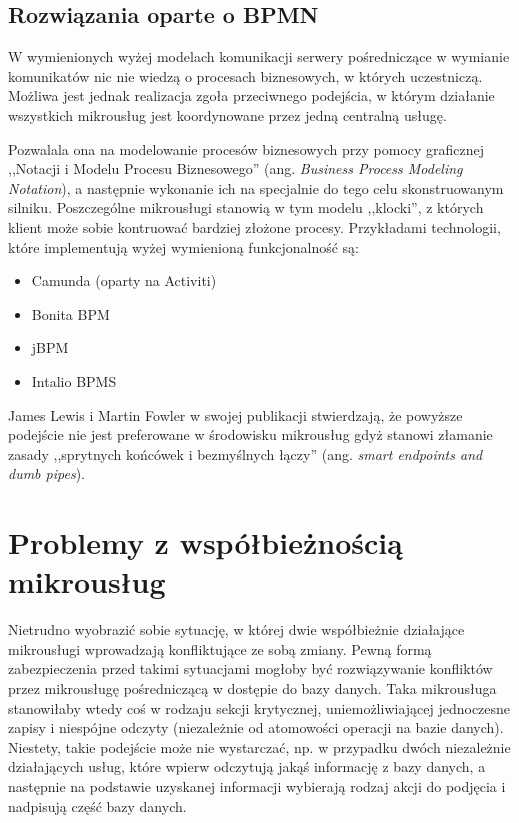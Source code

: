 \documentclass[licencjacka]{pracamgr}
\begin{document}
\subsection{Rozwiązania oparte o BPMN}
W wymienionych wyżej modelach komunikacji serwery pośredniczące w wymianie
komunikatów nic nie wiedzą o procesach biznesowych, w których uczestniczą. 
Możliwa jest jednak realizacja zgoła przeciwnego podejścia, w którym działanie
wszystkich mikrousług jest koordynowane przez jedną centralną usługę.

Pozwalala ona na modelowanie procesów biznesowych przy pomocy graficznej
,,Notacji i Modelu Procesu Biznesowego'' (ang. \textit{Business Process Modeling
Notation}), a następnie wykonanie ich na specjalnie do tego celu skonstruowanym
silniku. Poszczególne mikrousługi stanowią w tym modelu ,,klocki'', z których
klient może sobie kontruować bardziej złożone procesy. Przykładami technologii,
które implementują wyżej wymienioną funkcjonalność są:
\begin{itemize}
	\item Camunda (oparty na Activiti)
	\item Bonita BPM
	\item jBPM
	\item Intalio BPMS
\end{itemize}

James Lewis i Martin Fowler w swojej publikacji \cite{fowlermicroservices}
stwierdzają, że powyższe podejście nie jest preferowane w środowisku mikrousług
gdyż stanowi złamanie zasady ,,sprytnych końcówek i bezmyślnych łączy'' (ang.
\textit{smart endpoints and dumb pipes}).

\section{Problemy z współbieżnością mikrousług}

Nietrudno wyobrazić sobie sytuację, w której dwie współbieżnie działające mikrousługi
wprowadzają konfliktujące ze sobą zmiany. Pewną formą zabezpieczenia przed takimi sytuacjami
mogłoby być rozwiązywanie konfliktów przez mikrousługę pośredniczącą w dostępie do bazy danych.
Taka mikrousługa stanowiłaby wtedy coś w rodzaju sekcji krytycznej, uniemożliwiającej jednoczesne zapisy
i niespójne odczyty (niezależnie od atomowości operacji na bazie danych). 
Niestety, takie podejście może nie wystarczać, np. w przypadku dwóch niezależnie działających usług, które wpierw
odczytują jakąś informację z bazy danych, a następnie na podstawie uzyskanej informacji wybierają rodzaj
akcji do podjęcia i nadpisują część bazy danych.
\end{document}
